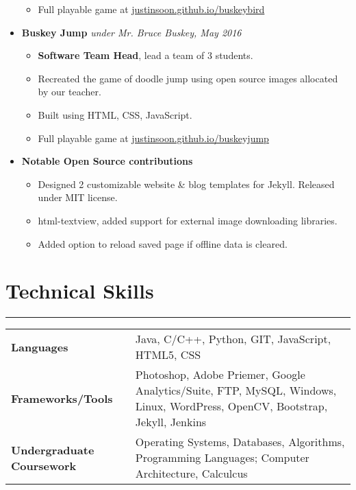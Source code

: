 \documentclass[a4paper]{article}
\begin{document}
\begin{itemize}
\begin{itemize}
		\item Full playable game at \href{http://justinsoon.github.io/BuskeyBird/}{justinsoon.github.io/buskeybird}
	      \end{itemize}
	\item
	      \textbf{Buskey Jump}
	      \hfill \textit{under Mr. Bruce Buskey, May 2016}
	      \begin{itemize}
		\vspace{-2mm} \setlength\itemsep{-0.7mm}
		\item \textbf{Software Team Head}, lead a team of 3 students.
		\item Recreated the game of doodle jump using open source images allocated by our teacher.
		\item Built using HTML, CSS, JavaScript.
		\item Full playable game at \href{https://justinsoon.github.io/buskeyjump/}{justinsoon.github.io/buskeyjump}
	      \end{itemize}
	\item
	      \textbf{Notable Open Source contributions}
	      \begin{itemize}
	      	\vspace{-2mm} \setlength\itemsep{-0.7mm}
	      	\item Designed 2 customizable website \& blog templates for Jekyll. Released under MIT license.
	      	\item html-textview, added support for external image downloading libraries.
	      	\item Added option to reload saved page if offline data is cleared.
	      \end{itemize}
\end{itemize}

\section*{Technical Skills}
\hrule
\vspace{3mm}
\begin{tabular}{@{}m{40mm}m{130mm}@{}}
	\textbf{\textrm{Languages}}        & Java, C/C++, Python, GIT, JavaScript, HTML5, CSS\\
	\textbf{\textrm{Frameworks/Tools}} & Photoshop, Adobe Priemer, Google Analytics/Suite, FTP, MySQL, Windows, Linux, WordPress, OpenCV, Bootstrap, Jekyll, Jenkins\\
	\textbf{\textrm{Undergraduate Coursework}} & Operating Systems, Databases, Algorithms, Programming Languages; Computer Architecture, Calculcus\\
\end{tabular}
\end{document}
